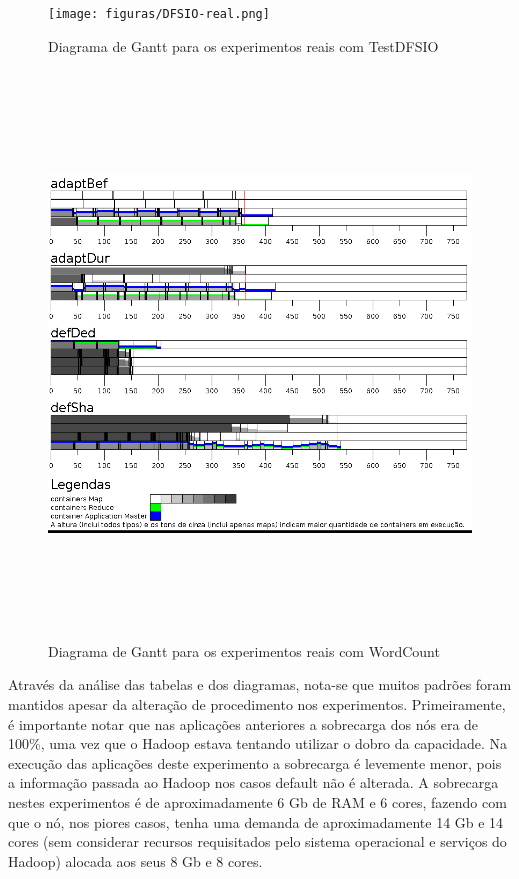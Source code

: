 \begin{figure}[!ht]
	\centering
	\texttt{[image: figuras/DFSIO-real.png]}
	\caption{Diagrama de Gantt para os experimentos reais com TestDFSIO}
	\label{fig:exp2IO}
\end{figure}

\begin{figure}[!ht]
	\centering
	\includegraphics[height=15cm]{figuras/WC-real.png}
	\caption{Diagrama de Gantt para os experimentos reais com WordCount}
	\label{fig:exp2WC}
\end{figure}

Através da análise das tabelas e dos diagramas, nota-se que muitos padrões foram mantidos apesar da alteração de procedimento nos experimentos. Primeiramente, é importante notar que nas aplicações anteriores a sobrecarga dos nós era de 100\%, uma vez que o Hadoop estava tentando utilizar o dobro da capacidade. Na execução das aplicações deste experimento a sobrecarga é levemente menor, pois a informação passada ao Hadoop nos casos default não é alterada. A sobrecarga nestes experimentos é de aproximadamente 6 Gb de RAM e 6 cores, fazendo com que o nó, nos piores casos, tenha uma demanda de aproximadamente 14 Gb e 14 cores (sem considerar recursos requisitados pelo sistema operacional e serviços do Hadoop) alocada aos seus 8 Gb e 8 cores.

